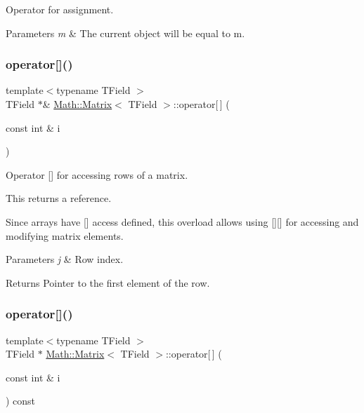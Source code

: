 Operator for assignment. 


\begin{DoxyParams}{Parameters}
{\em m} & The current object will be equal to m. \\
\hline
\end{DoxyParams}
\mbox{\label{classMath_1_1Matrix_ac2ab22aff5aaa615f58fb42a64e1e698}} 
\subsubsection{\texorpdfstring{operator[]()}{operator[]()}\hspace{0.1cm}{\footnotesize\ttfamily [1/2]}}
{\footnotesize\ttfamily template$<$typename T\+Field $>$ \\
T\+Field $\ast$\& \mbox{\hyperlink{classMath_1_1Matrix}{Math\+::\+Matrix}}$<$ T\+Field $>$\+::operator\mbox{[}$\,$\mbox{]} (\begin{DoxyParamCaption}\item[{const int \&}]{i }\end{DoxyParamCaption})}



Operator \mbox{[}\mbox{]} for accessing rows of a matrix. 

This returns a reference.

Since arrays have \mbox{[}\mbox{]} access defined, this overload allows using \mbox{[}\mbox{]}\mbox{[}\mbox{]} for accessing and modifying matrix elements.


\begin{DoxyParams}{Parameters}
{\em j} & Row index. \\
\hline
\end{DoxyParams}
\begin{DoxyReturn}{Returns}
Pointer to the first element of the row. 
\end{DoxyReturn}
\mbox{\label{classMath_1_1Matrix_af7be31f5a4a0448fe4b4f6c9d3893879}} 
\subsubsection{\texorpdfstring{operator[]()}{operator[]()}\hspace{0.1cm}{\footnotesize\ttfamily [2/2]}}
{\footnotesize\ttfamily template$<$typename T\+Field $>$ \\
T\+Field $\ast$ \mbox{\hyperlink{classMath_1_1Matrix}{Math\+::\+Matrix}}$<$ T\+Field $>$\+::operator\mbox{[}$\,$\mbox{]} (\begin{DoxyParamCaption}\item[{const int \&}]{i }\end{DoxyParamCaption}) const}



